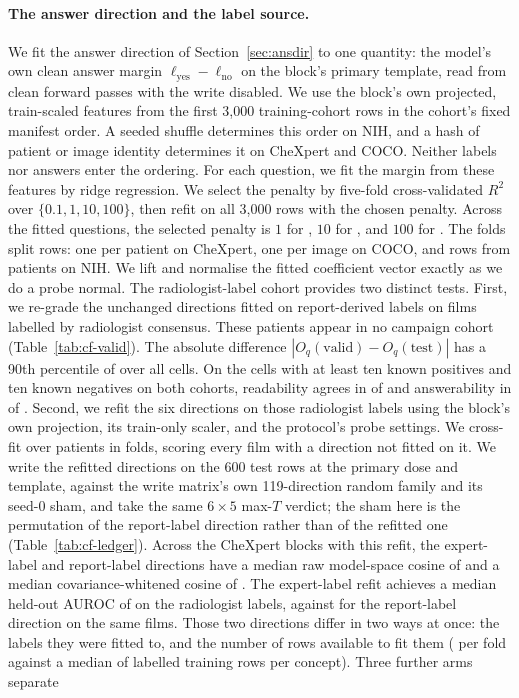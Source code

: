 \documentclass{article}
\begin{document}
\paragraph{The answer direction and the label source.} We fit the answer direction of Section~\ref{sec:ansdir} to one quantity: the model's own clean answer margin $\ell_{\mathrm{yes}}-\ell_{\mathrm{no}}$ on the block's primary template, read from clean forward passes with the write disabled. We use the block's own projected, train-scaled features from the first 3{,}000 training-cohort rows in the cohort's fixed manifest order. A seeded shuffle determines this order on NIH, and a hash of patient or image identity determines it on CheXpert and COCO. Neither labels nor answers enter the ordering. For each question, we fit the margin from these features by ridge regression. We select the penalty by five-fold cross-validated $R^2$ over $\{0.1,1,10,100\}$, then refit on all 3{,}000 rows with the chosen penalty. Across the \cfAnsAlphaCells{} fitted questions, the selected penalty is $1$ for \cfAnsAlphaOne{}, $10$ for \cfAnsAlphaTen{}, and $100$ for \cfAnsAlphaHundred{}. The folds split rows: one per patient on CheXpert, one per image on COCO, and rows from \cfAnsTrainUnitsNih{} patients on NIH. We lift and normalise the fitted coefficient vector exactly as we do a probe normal. The radiologist-label cohort provides two distinct tests. First, we re-grade the unchanged directions fitted on report-derived labels on \cfValidRows{} films labelled by radiologist consensus. These patients appear in no campaign cohort (Table~\ref{tab:cf-valid}). The absolute difference $|O_q(\text{valid})-O_q(\text{test})|$ has a 90th percentile of \cfValidNinetyDO{} over all cells. On the \cfValidSupported{} cells with at least ten known positives and ten known negatives on both cohorts, readability agrees in \cfValidReadableAgree{} of \cfValidReadableN{} and answerability in \cfValidAnswerAgree{} of \cfValidAnswerN{}. Second, we refit the six directions on those radiologist labels using the block's own projection, its train-only scaler, and the protocol's probe settings. We cross-fit over patients in \cfValidfitFolds{} folds, scoring every film with a direction not fitted on it. We write the refitted directions on the 600 test rows at the primary dose and template, against the write matrix's own 119-direction random family and its seed-0 sham, and take the same $6\times5$ max-$T$ verdict; the sham here is the permutation of the report-label direction rather than of the refitted one (Table~\ref{tab:cf-ledger}). Across the \cfValidfitBlocks{} CheXpert blocks with this refit, the expert-label and report-label directions have a median raw model-space cosine of \cfValidfitCosRaw{} and a median covariance-whitened cosine of \cfValidfitCosWhitened{}. The expert-label refit achieves a median held-out AUROC of \cfValidfitAurocExpert{} on the radiologist labels, against \cfValidfitAurocReportDir{} for the report-label direction on the same films. Those two directions differ in two ways at once: the labels they were fitted to, and the number of rows available to fit them (\cfVfArmExpertRows{} per fold against a median of \cfVfArmReportFullRows{} labelled training rows per concept). Three further arms separate 
\end{document}
